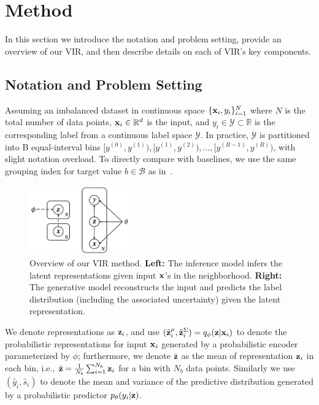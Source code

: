 \section{Method}
{In this section we introduce the notation and problem setting, %
provide an overview of our VIR, and then describe details on each of VIR's key components.} 

\subsection{Notation and Problem Setting}\label{sec:problem}
Assuming an imbalanced dataset in continuous space $\{{\bf x}_i, y_i \}^{N}_{i=1}$ where $N$ is the total number of data points, ${\bf x}_i \in \mathbb{R}^{d}$ is the input, and $y_i\in \mathcal{Y} \subset \mathbb{R} $ is the corresponding label from a continuous label space $\mathcal{Y}$. In practice, $\mathcal{Y}$ is partitioned into B equal-interval bins $[y^{(0)}, y^{(1)}), [y^{(1)}, y^{(2)}), ..., [y^{(B-1)}, y^{(B)})$, with slight notation overload. To directly compare with baselines, we use the same grouping index for target value $b \in \mathcal{B}$ as in~\citep{DIR}. 
%
\begin{figure}
\centering
\vskip -0.18in
\includegraphics[width=0.38\textwidth]{VIR_2.pdf}
\vskip -0.3cm
    \caption{Overview of our VIR method. \textbf{Left:} The inference model infers the latent representations given input ${\bf x}$'s in the neighborhood. \textbf{Right:} The generative model reconstructs the input and predicts the label distribution (including the associated uncertainty) given the latent representation.}
\vskip -1.2cm
\label{vir}
\end{figure}
%
We denote representations as ${\bf z}_i$, and use $ (\Tilde{{\bf z}}_i^{\mu}, \Tilde{{\bf z}}_i^{\Sigma}) = q_{\phi}({\bf z}|{\bf x}_i)$ to denote the probabilistic representations for input ${\bf x}_i$ generated by a probabilistic encoder parameterized by $\phi$; furthermore, we denote $\Bar{{\bf z}}$ as the mean of representation ${\bf z}_i$ in each bin, i.e., $\bar{{\bf z}} = \tfrac{1}{N_b} \sum^{N_b}_{i=1} {\bf z}_i$ for a bin with $N_b$ data points. 
{Similarly we use $ (\hat{y}_i,\hat{s}_i)$ to denote the mean and variance of the predictive distribution generated by a probabilistic predictor $p_{\theta}(y_i|{\bf z})$.} 


